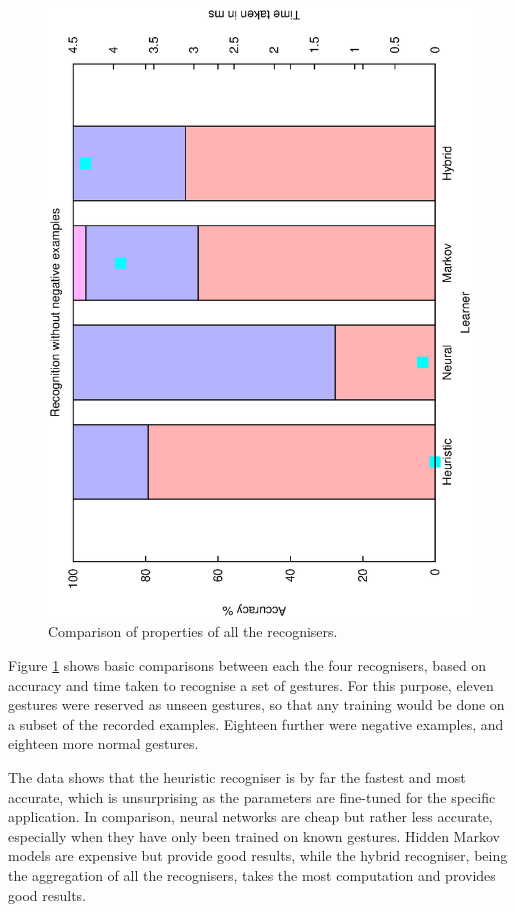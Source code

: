 \documentclass[12pt,a4,notitlepage]{report}
\renewcommand{\_}{\texttt{\symbol{95}}}
\newcommand{\<}{\texttt{\symbol{60}}}
\renewcommand{\>}{\texttt{\symbol{62}}}
\begin{document}
\begin{figure}
\includegraphics[scale=0.3,angle=-90]{results/all/no-neg.ps}
\caption{Comparison of properties of all the recognisers.}
\label{all_recognisers}
\end{figure}

Figure \ref{all_recognisers} shows basic comparisons between each the four recognisers, based on accuracy and time taken to recognise a set of gestures. For this purpose, eleven gestures were reserved as unseen gestures, so that any training would be done on a subset of the recorded examples. Eighteen further were negative examples, and eighteen more normal gestures.

The data shows that the heuristic recogniser is by far the fastest and most accurate, which is unsurprising as the parameters are fine-tuned for the specific application. In comparison, neural networks are cheap but rather less accurate, especially when they have only been trained on known gestures. Hidden Markov models are expensive but provide good results, while the hybrid recogniser, being the aggregation of all the recognisers, takes the most computation and provides good results.
\end{document}
